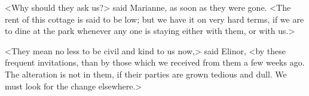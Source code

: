 <Why should they ask us?> said Marianne, as soon as they were gone. <The rent of this cottage is said to be low; but we have it on very hard terms, if we are to dine at the park whenever any one is staying either with them, or with us.>

<They mean no less to be civil and kind to us now,> said Elinor, <by these frequent invitations, than by those which we received from them a few weeks ago. The alteration is not in them, if their parties are grown tedious and dull. We must look for the change elsewhere.>